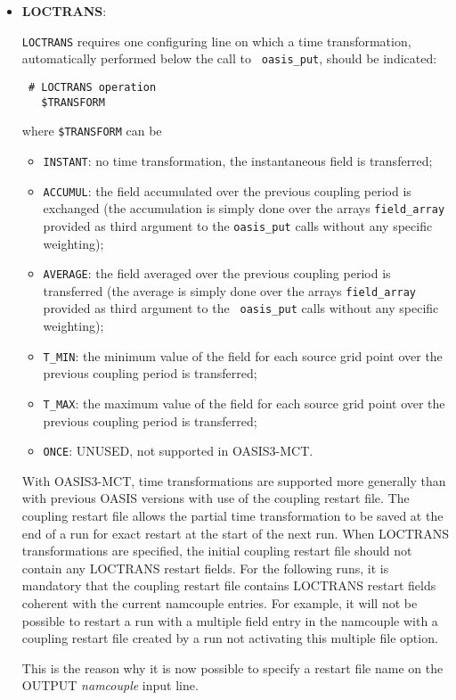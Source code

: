 \begin{itemize}

\item {\bf LOCTRANS}:

  {\tt LOCTRANS} requires one configuring line on which a time
  transformation, automatically performed below the call to {\tt
    oasis\_put}, should be indicated:

  \begin{verbatim}
 # LOCTRANS operation
   $TRANSFORM
\end{verbatim}
  \vspace{-0.2cm} where {\tt \$TRANSFORM} can be
  \begin{itemize}
  \item {\tt INSTANT}: no time transformation, the instantaneous field
    is transferred;
  \item {\tt ACCUMUL}: the field accumulated over the previous
    coupling period is exchanged (the accumulation is simply done over
    the arrays {\tt field\_array} provided as third argument to the
    {\tt oasis\_put} calls without any specific weighting);
  \item {\tt AVERAGE}: the field averaged over the previous coupling
    period is transferred (the average is simply done over the arrays
    {\tt field\_array} provided as third argument to the {\tt
      oasis\_put} calls without any specific weighting);
  \item {\tt T\_MIN}: the minimum value of the field for each source
    grid point over the previous coupling period is transferred;
  \item {\tt T\_MAX}: the maximum value of the field for each source
    grid point over the previous coupling period is transferred;
  \item {\tt ONCE}: UNUSED, not supported in OASIS3-MCT.
  \end{itemize}

  With OASIS3-MCT, time transformations are supported more generally
  than with previous OASIS versions with use of the coupling restart file.  The coupling restart file
  allows the partial time transformation to be saved at the end of a
  run for exact restart at the start of the next run. When LOCTRANS 
  transformations are specified, the initial coupling restart file
  should not contain any LOCTRANS restart fields. For the following
  runs, it is mandatory that the coupling restart file contains
  LOCTRANS restart fields coherent with the current namcouple
  entries. For example, it will not be possible to restart a run with
  a multiple field entry in the namcouple with a coupling restart file 
  created by a run not activating this multiple file option.

  This is
  the reason why it is now possible to specify a restart file name
  on the OUTPUT {\it namcouple} input line.

\end{itemize}


